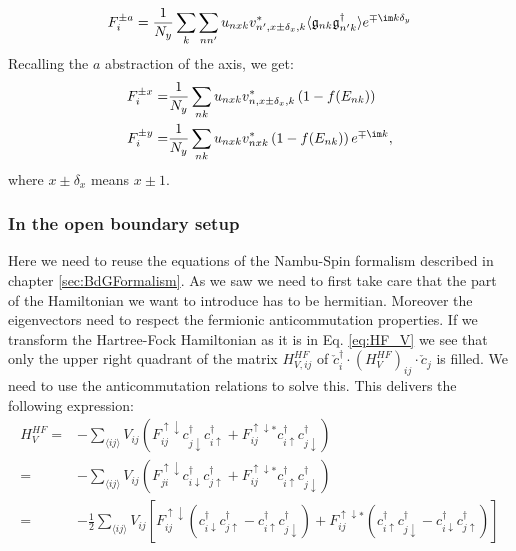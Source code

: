 \documentclass[../main.tex]{subfile}
\begin{document}
\begin{equation}\label{eq:transfo_F_x}
    F^{\pm a}_i =\frac{1}{N_y}\sum_{k}\sum_{nn'} u_{nx k}v_{n',x \pm \delta_x,k}^{\ast} \langle \mathfrak{g}_{nk} \mathfrak{g}_{n'k}^{\dagger} \rangle e^{\mp\im k \delta_y}
\end{equation}
Recalling the $a$ abstraction of the axis, we get:
\begin{align}
    F^{\pm x}_i =& \frac{1}{N_y} \sum_{nk} u_{nx k} v_{n,x\pm \delta_x,k}^{\ast}\left(1 - f(E_{nk})\right)\\
    F^{\pm y}_i =& \frac{1}{N_y} \sum_{nk} u_{nx k} v_{n x k}^{\ast}\left(1 - f(E_{nk})\right) e^{\mp \im k},
\end{align}
where $x\pm \delta_x$ means $x\pm1$.


\subsubsection{In the open boundary setup}
Here we need to reuse the equations of the Nambu-Spin formalism described in chapter \ref{sec:BdGFormalism}. As we saw we need to first
take care that the part of the Hamiltonian we want to introduce has to be hermitian. Moreover the eigenvectors need to respect the fermionic
anticommutation properties.
If we transform the Hartree-Fock Hamiltonian as it is in Eq. \ref{eq:HF_V} we see that only the upper right quadrant of the matrix $H_{V,ij}^{HF}$ 
of $\check{c}_i^{\dagger} \cdot (H_{V}^{HF})_{ij}\cdot \check{c}_j $ is filled. We need to use the anticommutation relations to solve this.
This delivers the following expression:
\begin{equation}
    \begin{aligned}
    H_V^{HF} =& -\sum_{\langle ij\rangle} V_{ij} \left(F_{ij}^{\uparrow \downarrow} c_{j\downarrow}^{\dagger}c_{i\uparrow}^{\dagger} +
     F_{ij}^{\uparrow \downarrow\ast} c_{i\uparrow}^{\dagger}c_{j\downarrow}^{\dagger}\right)\\
     =& -\sum_{\langle ij\rangle} V_{ij} \left(F_{ji}^{\uparrow \downarrow} c_{i\downarrow}^{\dagger}c_{j\uparrow}^{\dagger} +
     F_{ij}^{\uparrow \downarrow\ast} c_{i\uparrow}^{\dagger}c_{j\downarrow}^{\dagger}\right)\\
     =& -\frac{1}{2}\sum_{\langle ij\rangle} V_{ij} \left[F_{ij}^{\uparrow \downarrow} \left(c_{i\downarrow}^{\dagger}c_{j\uparrow}^{\dagger} - c_{i\uparrow}^{\dagger}c_{j\downarrow}^{\dagger}\right)
     + F_{ij}^{\uparrow \downarrow\ast}  \left(c_{i\uparrow}^{\dagger}c_{j\downarrow}^{\dagger} - c_{i\downarrow}^{\dagger}c_{j\uparrow}^{\dagger}\right)\right]\\
    \end{aligned}
\end{equation} 
\end{document}
